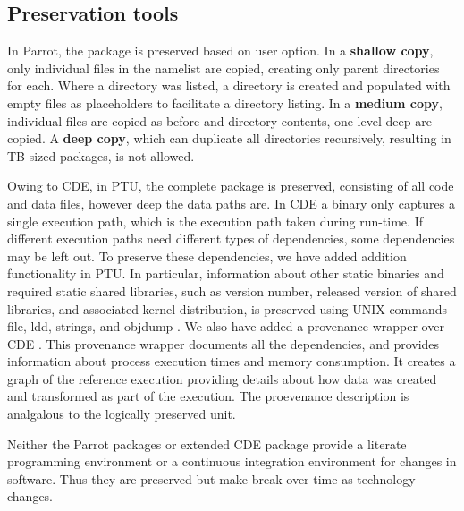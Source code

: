 \subsection{Preservation tools}

\vspace{5pt}
 In Parrot, the package is preserved based on user option.  
In a {\bf shallow copy}, only individual files in the namelist are copied,
creating only parent directories for each.  Where a directory was listed,
a directory is created and populated with empty files as placeholders
to facilitate a directory listing.  In a {\bf medium copy}, 
individual files are copied as before and directory contents, one level deep are copied. A {\bf deep copy}, which can duplicate all directories recursively,
resulting in TB-sized packages, is not allowed. 

\vspace{5pt}
 Owing to CDE, in PTU, the complete package is preserved, consisting of all code and data files, however deep the data paths are. 
In CDE a binary only captures a single execution path, which is the execution path taken during run-time. If different execution paths need different types of dependencies, some dependencies may be left out. To preserve these dependencies, we have added addition functionality in PTU. In particular, information about other static binaries and required static shared libraries, such as version number, released version of shared libraries, and associated kernel distribution, is preserved using UNIX commands file, ldd, strings, and objdump \cite{}. We also have added a provenance wrapper over CDE \cite{}. This provenance wrapper documents all the dependencies, and provides information about process execution times and memory consumption. It creates a graph of the reference execution providing details about how data was created and transformed as part of the execution. The proevenance description is analgalous to the logically preserved unit. 

Neither the Parrot packages or extended CDE package provide a literate programming environment or a continuous integration environment for changes in software. Thus they are preserved but make break over time as technology changes.
 
\vspace{5pt}

